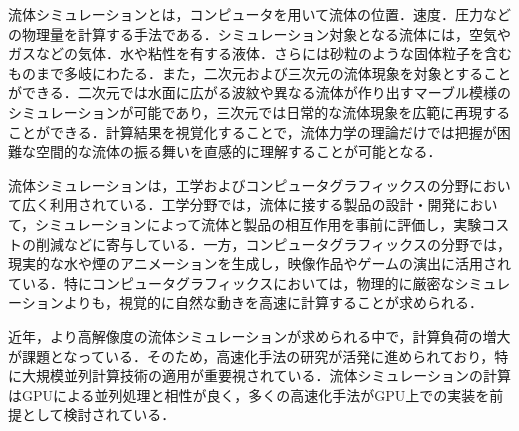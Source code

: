 \documentclass[a4j,12pt]{jreport}
\begin{document}



流体シミュレーションとは，コンピュータを用いて流体の位置．速度．圧力などの物理量を計算する手法である．シミュレーション対象となる流体には，空気やガスなどの気体．水や粘性を有する液体．さらには砂粒のような固体粒子を含むものまで多岐にわたる．また，二次元および三次元の流体現象を対象とすることができる．二次元では水面に広がる波紋や異なる流体が作り出すマーブル模様のシミュレーションが可能であり，三次元では日常的な流体現象を広範に再現することができる．計算結果を視覚化することで，流体力学の理論だけでは把握が困難な空間的な流体の振る舞いを直感的に理解することが可能となる．

流体シミュレーションは，工学およびコンピュータグラフィックスの分野において広く利用されている．工学分野では，流体に接する製品の設計・開発において，シミュレーションによって流体と製品の相互作用を事前に評価し，実験コストの削減などに寄与している．一方，コンピュータグラフィックスの分野では，現実的な水や煙のアニメーションを生成し，映像作品やゲームの演出に活用されている．特にコンピュータグラフィックスにおいては，物理的に厳密なシミュレーションよりも，視覚的に自然な動きを高速に計算することが求められる．

近年，より高解像度の流体シミュレーションが求められる中で，計算負荷の増大が課題となっている．そのため，高速化手法の研究が活発に進められており，特に大規模並列計算技術の適用が重要視されている．流体シミュレーションの計算はGPUによる並列処理と相性が良く，多くの高速化手法がGPU上での実装を前提として検討されている．
\end{document}
